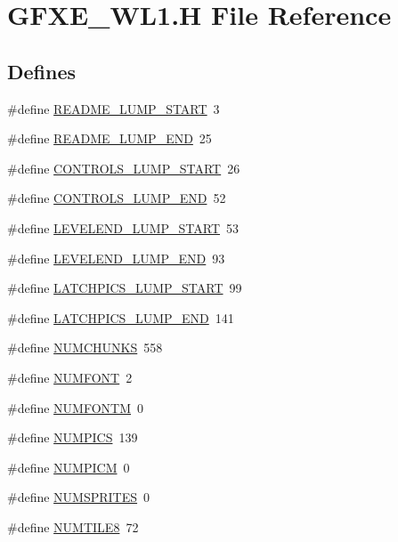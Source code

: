 \hypertarget{GFXE__WL1_8H}{
\section{GFXE\_\-WL1.H File Reference}
\label{GFXE__WL1_8H}
}
\subsection*{Defines}
\begin{DoxyCompactItemize}
\item 
\#define \hyperlink{GFXE__WL1_8H_af1b7fca71ee9337c9dbf43d0949aa105}{README\_\-LUMP\_\-START}~3
\item 
\#define \hyperlink{GFXE__WL1_8H_aecaa7957af595ae525e60cc37dfcf3da}{README\_\-LUMP\_\-END}~25
\item 
\#define \hyperlink{GFXE__WL1_8H_adc808f8c4862206753bc6b22a20de529}{CONTROLS\_\-LUMP\_\-START}~26
\item 
\#define \hyperlink{GFXE__WL1_8H_a227d962ff8d8d1d9a0f31a2d7b35f04d}{CONTROLS\_\-LUMP\_\-END}~52
\item 
\#define \hyperlink{GFXE__WL1_8H_a1895eb960cb12bb7b49bf322e79d6c80}{LEVELEND\_\-LUMP\_\-START}~53
\item 
\#define \hyperlink{GFXE__WL1_8H_a01e5f4d5f8e05beb4315b9ad907e06e7}{LEVELEND\_\-LUMP\_\-END}~93
\item 
\#define \hyperlink{GFXE__WL1_8H_a88207d485bad504249067e714794e823}{LATCHPICS\_\-LUMP\_\-START}~99
\item 
\#define \hyperlink{GFXE__WL1_8H_a366d7af9e92d0a7d4ee631d44c4ecbf7}{LATCHPICS\_\-LUMP\_\-END}~141
\item 
\#define \hyperlink{GFXE__WL1_8H_a06c8b188cc3cdd25a5451beeefddfa66}{NUMCHUNKS}~558
\item 
\#define \hyperlink{GFXE__WL1_8H_a7686ac8ed1dbf71ebee2b4711dae0edd}{NUMFONT}~2
\item 
\#define \hyperlink{GFXE__WL1_8H_afd7a523b060f425fd737a94c044892ac}{NUMFONTM}~0
\item 
\#define \hyperlink{GFXE__WL1_8H_a437727f0f1480aff6a1437f8881e2241}{NUMPICS}~139
\item 
\#define \hyperlink{GFXE__WL1_8H_a2eb878497ab6b2a4f80015a218f38c8f}{NUMPICM}~0
\item 
\#define \hyperlink{GFXE__WL1_8H_ac7e5f97c96cc0101c6f998c7010813a3}{NUMSPRITES}~0
\item 
\#define \hyperlink{GFXE__WL1_8H_a1ad83311a1b6300dcac06636eb1d03b4}{NUMTILE8}~72
\item 

\end{DoxyCompactItemize}
